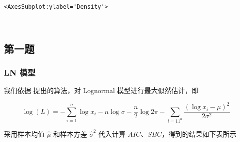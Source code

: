 \documentclass[11pt]{article}
\makeatletter
\newcommand{\boxspacing}{\kern\kvtcb@left@rule\kern\kvtcb@boxsep}
\newcommand{\prompt}[4]{
        {\ttfamily\llap{{\color{#2}[#3]:\hspace{3pt}#4}}\vspace{-\baselineskip}}
    }
\makeatother
\begin{document}
            \begin{tcolorbox}[breakable, size=fbox, boxrule=.5pt, pad at break*=1mm, opacityfill=0]
\prompt{Out}{outcolor}{1}{\boxspacing}
\begin{Verbatim}[commandchars=\\\{\}]
<AxesSubplot:ylabel='Density'>
\end{Verbatim}
\end{tcolorbox}

    \begin{center}
    \end{center}
    { \hspace*{\fill} \\}

    \hypertarget{ux7b2cux4e00ux9898}{%
\subsection{第一题}\label{ux7b2cux4e00ux9898}}

\hypertarget{ln-ux6a21ux578b}{%
\subsubsection{LN 模型}\label{ln-ux6a21ux578b}}

我们依据\cite{wang2020corrected} 提出的算法，对 Lognormal
模型进行最大似然估计，即

\[
\log(L) = -\sum_{i=1}^n\log x_i-n\log\sigma-\frac{n}{2}\log 2\pi - \sum_{i=11^n}\frac{(\log x_i-\mu)^2}{2\sigma^2}
\]

采用样本均值 \(\hat\mu\) 和样本方差 \(\hat\sigma^2\) 代入计算
\(AIC\)、\(SBC\)，得到的结果如下表所示
\end{document}
